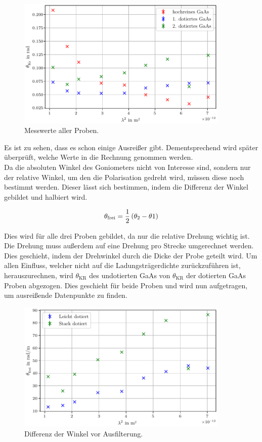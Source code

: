 \begin{figure}[H]
    \centering
    \includegraphics[width=0.9\textwidth]{Kristallwinkel.pdf}
    \caption{Messwerte aller Proben.}
    \label{fig:roh}
\end{figure}

\noindent Es ist zu sehen, dass es schon einige Ausreißer gibt. Dementsprechend wird später überprüft, welche 
Werte in die Rechnung genommen werden.\\
\noindent Da die absoluten Winkel des Goniometers nicht von Interesse sind, sondern nur der relative 
Winkel, um den die Polarisation gedreht wird, müssen diese noch bestimmt werden. Dieser lässt sich 
bestimmen, indem die Differenz der Winkel gebildet und halbiert wird.

\begin{equation}
    \centering
    \theta_\text{frei}=\frac{1}{2} \left(\theta_2 - \theta 1 \right)
    \label{eqn:theta_frei}
\end{equation}

\noindent Dies wird für alle drei Proben gebildet, da nur die relative Drehung wichtig ist. 
Die Drehung muss außerdem auf eine Drehung pro Strecke umgerechnet werden. Dies geschieht, indem der Drehwinkel 
durch die Dicke der Probe geteilt wird.
Um allen Einfluss, welcher nicht auf die Ladungsträgerdichte zurückzuführen ist, herauszurechnen, wird 
$\theta_\text{KR}$ des undotierten GaAs von $\theta_\text{KR}$ der dotierten GaAs Proben abgezogen. 
Dies geschieht für beide Proben und wird nun aufgetragen, um ausreißende Datenpunkte zu finden.

\begin{figure}[H]
    \centering
    \includegraphics[width=0.9\textwidth]{Rohplot.pdf}
    \caption{Differenz der Winkel vor Ausfilterung.}
    \label{fig:pre}
\end{figure}

